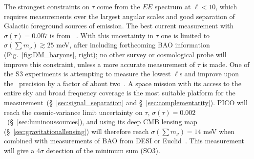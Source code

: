 \documentclass[PICOAPC.tex]{subfiles}
\begin{document}
The strongest constraints on $\tau$ come from the $EE$ spectrum at $\ell < 10$, which requires measurements over the largest angular scales  and good separation of Galactic foreground sources of emission. The best current measurement with $\sigma({\tau}) = 0.007$ is from \planck~\cite{Planck2018_VI}. With this uncertainty in $\tau$ one is limited to  $\sigma(\sum m_\nu) \gtrsim 25$ meV, after including forthcoming \ac{BAO} information (Fig.~\ref{fig:DM_baryons}, right); no other survey or cosmological probe will improve this constraint, unless a more accurate measurement of $\tau$ is made. One of the S3 experiments is attempting to measure the lowest $\ell$s and improve upon the \planck\ precision by a factor of about two~\citep{class}. A space mission with its access to the entire sky and broad frequency coverage is the most suitable platform for the measurement~(\S~\ref{sec:signal_separation} and \S~\ref{sec:complementarity}). PICO will reach the cosmic-variance limit uncertainty on $\tau$, $\sigma(\tau) = 0.002$~(\S~\ref{sec:luminoussources}), and using its deep CMB lensing map (\S~\ref{sec:gravitationallensing}) will therefore reach $\sigma(\sum m_\nu) = 14$ meV when combined with measurements of \ac{BAO} from DESI or Euclid~\cite{Levi:2013gra}.
This measurement will give a $4\sigma$ detection of the minimum sum (SO3). 

\end{document}
